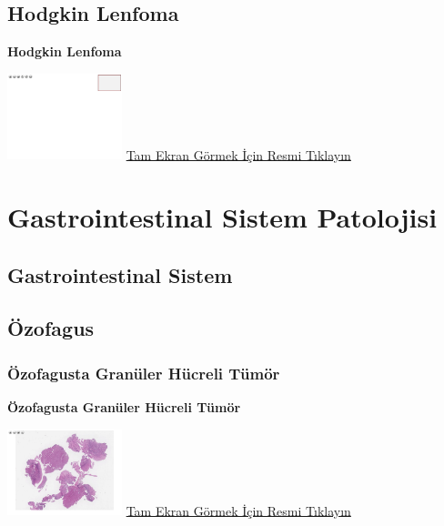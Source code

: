 \documentclass[
  letterpaper,
  DIV=11,
  numbers=noendperiod]{scrreprt}
\begin{document}
\hypertarget{sec-hodgkin-lenfoma}{%
\chapter{Hodgkin Lenfoma}\label{sec-hodgkin-lenfoma}}

\textbf{Hodgkin Lenfoma}

\href{https://images.patolojiatlasi.com/template/HE.html}{\includegraphics[width=0.25\textwidth,height=\textheight]{./screenshots/template_screenshot.png}}
\href{https://images.patolojiatlasi.com/hodgkin/HE.html}{Tam Ekran
Görmek İçin Resmi Tıklayın}

\part{Gastrointestinal Sistem Patolojisi}

\hypertarget{sec-gastrointestinal-sistem}{%
\chapter{Gastrointestinal Sistem}\label{sec-gastrointestinal-sistem}}

\hypertarget{sec-ozofagus}{%
\chapter{Özofagus}\label{sec-ozofagus}}

\hypertarget{sec-ozofagus-granuler-hucreli-tumor}{%
\section{Özofagusta Granüler Hücreli
Tümör}\label{sec-ozofagus-granuler-hucreli-tumor}}

\textbf{Özofagusta Granüler Hücreli Tümör}

\href{https://images.patolojiatlasi.com/granular-cell-tumor/HE.html}{\includegraphics[width=0.25\textwidth,height=\textheight]{./screenshots/granular-cell-tumor_screenshot.png}}
\href{https://images.patolojiatlasi.com/granular-cell-tumor/HE.html}{Tam
Ekran Görmek İçin Resmi Tıklayın}
\end{document}
